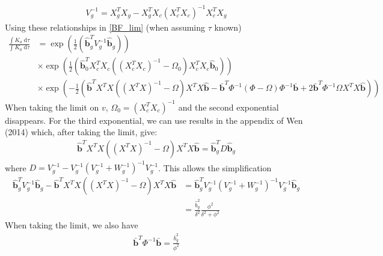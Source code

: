 \documentclass[10pt]{article}
\newcommand{\der}{{\text{d}}} %
\begin{document}
\begin{equation}
  \begin{aligned}
    V_g^{-1} = X_g^T X_g - X_g^T X_c (X_c^T X_c)^{-1} X_c^T X_g
    \label{var_bhat}
  \end{aligned}
\end{equation}
Using these relationships in \eqref{BF_lim} (when assuming $\tau$ known)
\begin{equation}
  \begin{aligned}
    \frac{\int K_a \; \der \tau}{\int K_0 \; \der \tau} &= \exp \left( \frac{1}{2} \left( \hat{\bm{b}}_g^T V_g^{-1} \hat{\bm{b}}_g \right) \right) \\
    & \times \exp \left( \frac{1}{2} \left( \hat{\bm{b}}_0^T X_c^T X_c ((X_c^T X_c)^{-1} - \Omega_0) X_c^T X_c \hat{\bm{b}}_0 \right) \right) \\
    & \times \exp \left( - \frac{1}{2} \left( \hat{\bm{b}}^T X^T X ((X^T X)^{-1} - \Omega) X^T X \hat{\bm{b}} - \bar{\bm{b}}^T \Phi^{-1} (\Phi - \Omega) \Phi^{-1} \bar{\bm{b}} +2 \bar{\bm{b}}^T \Phi^{-1} \Omega X^T X \hat{\bm{b}} \right) \right)
  \end{aligned}
\end{equation}
When taking the limit on $v$, $\Omega_0 = (X_c^T X_c)^{-1}$ and the second exponential disappears.
For the third exponential, we can use results in the appendix of Wen (2014) which, after taking the limit, give:
\begin{equation}
  \begin{aligned}
    \hat{\bm{b}}^T X^T X ((X^T X)^{-1} - \Omega) X^T X \hat{\bm{b}} = \hat{\bm{b}}_g^T D \hat{\bm{b}}_g
  \end{aligned}
\end{equation}
where $D = V_g^{-1} - V_g^{-1} (V_g^{-1} + W_g^{-1})^{-1} V_g^{-1}$.
This allows the simplification
\begin{equation}
  \begin{aligned}
    \hat{\bm{b}}_g^T V_g^{-1} \hat{\bm{b}}_g - \hat{\bm{b}}^T X^T X ((X^T X)^{-1} - \Omega) X^T X \hat{\bm{b}} &= \hat{\bm{b}}_g^T V_g^{-1} (V_g^{-1} + W_g^{-1})^{-1} V_g^{-1} \hat{\bm{b}}_g \\
    &= \frac{\hat{b}_g^2}{\delta^2} \frac{\phi^2}{\delta^2 + \phi^2}
  \end{aligned}
\end{equation}
When taking the limit, we also have
\begin{equation}
  \begin{aligned}
    \bar{\bm{b}}^T \Phi^{-1} \bar{\bm{b}} = \frac{\bar{b}_g^2}{\phi^2}
  \end{aligned}
\end{equation}
\end{document}
